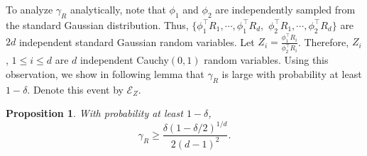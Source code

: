 \documentclass[jmlr]{article}
\newcommand{\EZ}{\mathcal{E}_{Z}}
\newtheorem{prop}[lemma]{Proposition}
\theoremstyle{definition}
\begin{document}




To analyze $\gamma_R$ analytically,
note that $\phi_1$ and $\phi_2$ are independently sampled from the  standard Gaussian distribution. 
Thus, $\{\phi_1^{\top}R_1, \cdots, \phi_1^{\top}R_d,$ $\phi_2^{\top}R_1, \cdots, \phi_2^{\top}R_d\}$ are $2d$ independent standard Gaussian random variables. 
Let $Z_i = \frac{\phi_1^{\top}R_i}{\phi_2^{\top}R_i}$. Therefore, $Z_i$, $1\le i\le d$ are $d$ independent Cauchy$(0,1)$ random variables. Using this observation, we show in following lemma that $\gamma_R$ is large with probability at least $1-\delta$. Denote this event by $\EZ$.

\begin{prop}
\label{prop:CauchyGap}
With probability at least $1-\delta$,
\[
\gamma_R \ge \frac{\delta(1-\delta/2)^{1/d}}{2(d-1)^2}.
\]
\end{prop}

\end{document}
